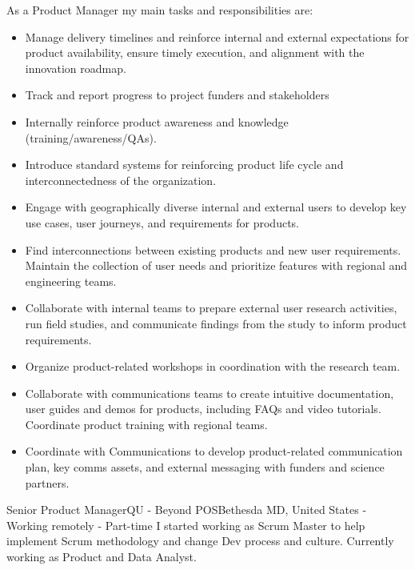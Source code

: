 \documentclass[11pt,a4paper,sans]{moderncv}
\begin{document}
As a Product Manager my main tasks and responsibilities are:
\begin{itemize}
  \item Manage delivery timelines and reinforce internal and external expectations for product availability, ensure timely execution, and alignment with the innovation roadmap.
  \item Track and report progress to project funders and stakeholders
  \item Internally reinforce product awareness and knowledge (training/awareness/QAs).
  \item Introduce standard systems for reinforcing product life cycle and interconnectedness of the organization.
  \item Engage with geographically diverse internal and external users to develop key use cases, user journeys, and requirements for products.
  \item Find interconnections between existing products and new user requirements. Maintain the collection of user needs and prioritize features with regional and engineering teams.
  \item Collaborate with internal teams to prepare external user research activities, run field studies, and communicate findings from the study to inform product requirements.
  \item Organize product-related workshops in coordination with the research team.
  \item Collaborate with communications teams to create intuitive documentation, user guides and demos for products, including FAQs and video tutorials. Coordinate product training with regional teams.
  \item Coordinate with Communications to develop product-related communication plan, key comms assets, and external messaging with funders and science partners.
\newline
\newline
\end{itemize}

 {Senior Product Manager}{QU - Beyond POS}{Bethesda MD, United States - Working remotely - Part-time }{}{}{}
I started working as Scrum Master to help implement Scrum methodology and change Dev process and culture. Currently working as Product and Data Analyst.
\\
\end{document}
